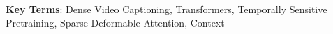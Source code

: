 \textbf{Key Terms}: Dense Video Captioning, Transformers, Temporally Sensitive Pretraining, Sparse Deformable Attention, Context

